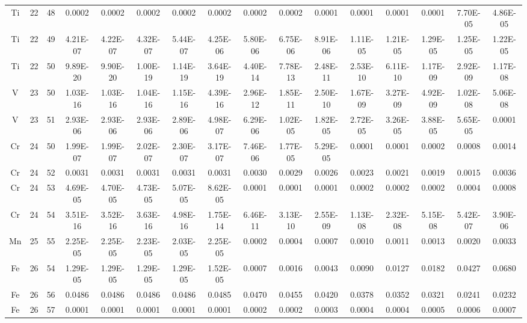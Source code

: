 {\begin{tabular}{|c|c|c|c|c|c|c|c|c|c|c|c|c|c|c|c|}
Ti & 22 & 48   & 0.0002    & 0.0002    & 0.0002    & 0.0002    & 0.0002    & 0.0002    & 0.0002    & 0.0001    & 0.0001    & 0.0001    & 0.0001    & 7.70E-05  & 4.86E-05  \\
Ti & 22 & 49   & 4.21E-07  & 4.22E-07  & 4.32E-07  & 5.44E-07  & 4.25E-06  & 5.80E-06  & 6.75E-06  & 8.91E-06  & 1.11E-05  & 1.21E-05  & 1.29E-05  & 1.25E-05  & 1.22E-05  \\
Ti & 22 & 50   & 9.89E-20  & 9.90E-20  & 1.00E-19  & 1.14E-19  & 3.64E-19  & 4.40E-14  & 7.78E-13  & 2.48E-11  & 2.53E-10  & 6.11E-10  & 1.17E-09  & 2.92E-09  & 1.17E-08  \\
V  & 23 & 50   & 1.03E-16  & 1.03E-16  & 1.04E-16  & 1.15E-16  & 4.39E-16  & 2.96E-12  & 1.85E-11  & 2.50E-10  & 1.67E-09  & 3.27E-09  & 4.92E-09  & 1.02E-08  & 5.06E-08  \\
V  & 23 & 51   & 2.93E-06  & 2.93E-06  & 2.93E-06  & 2.89E-06  & 4.98E-07  & 6.29E-06  & 1.02E-05  & 1.82E-05  & 2.72E-05  & 3.26E-05  & 3.88E-05  & 5.65E-05  & 0.0001    \\
Cr & 24 & 50   & 1.99E-07  & 1.99E-07  & 2.02E-07  & 2.30E-07  & 3.17E-07  & 7.46E-06  & 1.77E-05  & 5.29E-05  & 0.0001    & 0.0001    & 0.0002    & 0.0008    & 0.0014    \\
Cr & 24 & 52   & 0.0031    & 0.0031    & 0.0031    & 0.0031    & 0.0031    & 0.0030    & 0.0029    & 0.0026    & 0.0023    & 0.0021    & 0.0019    & 0.0015    & 0.0036    \\
Cr & 24 & 53   & 4.69E-05  & 4.70E-05  & 4.73E-05  & 5.07E-05  & 8.62E-05  & 0.0001    & 0.0001    & 0.0001    & 0.0002    & 0.0002    & 0.0002    & 0.0004    & 0.0008    \\
Cr & 24 & 54   & 3.51E-16  & 3.52E-16  & 3.63E-16  & 4.98E-16  & 1.75E-14  & 6.46E-11  & 3.13E-10  & 2.55E-09  & 1.13E-08  & 2.32E-08  & 5.15E-08  & 5.42E-07  & 3.90E-06  \\
Mn & 25 & 55   & 2.25E-05  & 2.25E-05  & 2.23E-05  & 2.03E-05  & 2.25E-05  & 0.0002    & 0.0004    & 0.0007    & 0.0010    & 0.0011    & 0.0013    & 0.0020    & 0.0033    \\
Fe & 26 & 54   & 1.29E-05  & 1.29E-05  & 1.29E-05  & 1.29E-05  & 1.52E-05  & 0.0007    & 0.0016    & 0.0043    & 0.0090    & 0.0127    & 0.0182    & 0.0427    & 0.0680    \\
Fe & 26 & 56   & 0.0486    & 0.0486    & 0.0486    & 0.0486    & 0.0485    & 0.0470    & 0.0455    & 0.0420    & 0.0378    & 0.0352    & 0.0321    & 0.0241    & 0.0232    \\
Fe & 26 & 57   & 0.0001    & 0.0001    & 0.0001    & 0.0001    & 0.0001    & 0.0002    & 0.0002    & 0.0003    & 0.0004    & 0.0004    & 0.0005    & 0.0006    & 0.0007    \\

\end{tabular}}
